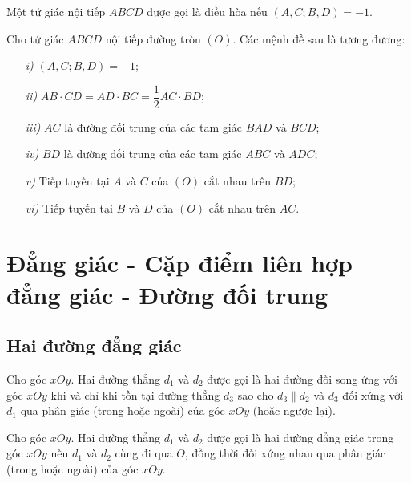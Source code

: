         \begin{definition}
            Một tứ giác nội tiếp \(ABCD\) được gọi là điều hòa nếu \((A,C;B,D) = -1\).
        \end{definition}

        \begin{theorem}
            Cho tứ giác \(ABCD\) nội tiếp đường tròn \((O)\). Các mệnh đề sau là tương đương:
            \begin{enumerate}
                \item[\textit{i)}] \((A,C;B,D) = -1\);
                \item[\textit{ii)}] \(AB \cdot CD = AD \cdot BC = \dfrac{1}{2}AC \cdot BD\);
                \item[\textit{iii)}] \(AC\) là đường đối trung của các tam giác \(BAD\) và \(BCD\);
                \item[\textit{iv)}] \(BD\) là đường đối trung của các tam giác \(ABC\) và \(ADC\);
                \item[\textit{v)}] Tiếp tuyến tại \(A\) và \(C\) của \((O)\) cắt nhau trên \(BD\);
                \item[\textit{vi)}] Tiếp tuyến tại \(B\) và \(D\) của \((O)\) cắt nhau trên \(AC\).
            \end{enumerate}
        \end{theorem}

    \section{Đẳng giác - Cặp điểm liên hợp đẳng giác - Đường đối trung}

    \subsection{Hai đường đẳng giác}

        \begin{definition}
            Cho góc \(xOy\). Hai đường thẳng \(d_1\) và \(d_2\) được gọi là hai đường đối song ứng với góc \(xOy\) khi và chỉ khi tồn tại đường thẳng \(d_3\) sao cho \(d_3 \parallel d_2\) và \(d_3\) đối xứng với \(d_1\) qua phân giác (trong hoặc ngoài) của góc \(xOy\) (hoặc ngược lại).
        \end{definition}

        \begin{definition}
            Cho góc \(xOy\). Hai đường thẳng \(d_1\) và \(d_2\) được gọi là hai đường đẳng giác trong góc \(xOy\) nếu \(d_1\) và \(d_2\) cùng đi qua \(O\), đồng thời đối xứng nhau qua phân giác (trong hoặc ngoài) của góc \(xOy\).
        \end{definition}

